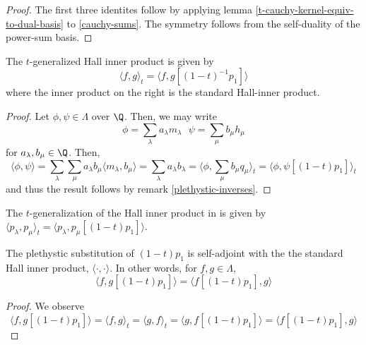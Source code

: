 \documentclass[11pt,leqno,oneside]{amsart}
\numberwithin{thm}{section}
\newcommand{\sym}{\Lambda}
\begin{document}
\begin{proof}
  The first three identites follow by applying lemma
  \ref{t-cauchy-kernel-equiv-to-dual-basis} to \ref{cauchy-sums}. The
  symmetry follows from the self-duality of the power-sum basis. 
\end{proof}
\begin{prop}
  The \(t\)-generalized Hall inner product is given by \[
    \langle f,g \rangle_t = \langle f,g[(1-t)^{-1} p_1] \rangle
  \]
  where the inner product on the right is the standard Hall-inner product.
\end{prop}
\begin{proof}
  Let \(\phi,\psi \in \sym\) over \(\Q\). Then, we may write \[
    \phi = \sum_\lambda a_\lambda m_\lambda \ \ \ \psi = \sum_\mu b_\mu h_\mu
  \]
  for \(a_\lambda, b_\mu \in \Q\). Then, \[
    \langle \phi,\psi \rangle = \sum_\lambda \sum_\mu a_\lambda b_\mu
    \langle m_\lambda, b_\mu \rangle = \sum_\lambda a_\lambda
    b_\lambda = \langle \phi, \sum_\mu b_\mu q_\mu \rangle_t = \langle \phi,
    \psi[(1-t) p_1] \rangle_t
  \]
  and thus the result follows by remark \ref{plethystic-inverses}.
\end{proof}
\begin{rmk}
  The \(t\)-generalization of the Hall inner product in
  \cite{alg-comb} is given by \(\langle p_\lambda,p_\mu \rangle_t =
  \langle p_\lambda,p_\mu[(1-t)p_1] \rangle\). 
\end{rmk}
\begin{cor}
  The plethystic substitution of \((1-t)p_1\) is self-adjoint with the
  the standard Hall inner product, \(\langle \cdot,\cdot \rangle\). In other words, for
  \(f,g \in \sym\), \[
    \langle f, g[(1-t)p_1] \rangle = \langle f[(1-t)p_1],g \rangle
  \]
\end{cor}
\begin{proof}
  We observe \[
    \langle f,g[(1-t)p_1] \rangle = \langle f,g \rangle_t = \langle
    g,f \rangle_t = \langle g,f[(1-t)p_1] \rangle = \langle f[(1-t)p_1],g \rangle
  \]
\end{proof}
\end{document}
